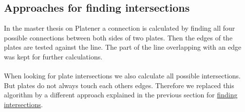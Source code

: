 \documentclass[../ClassicThesis.tex]{subfiles}
\begin{document}
\subsection{Approaches for finding intersections}
In the master thesis on Platener\cite{master-thesis} a connection is calculated by finding all four possible connections between both sides of two plates. Then the edges of the plates are tested against the line. The part of the line overlapping with an edge was kept for further calculations.\\
\*\\
When looking for plate intersections we also calculate all possible intersections. But plates do not always touch each others edges. Therefore we replaced this algorithm by a different approach explained in the previous section for \hyperref[findIntersections]{finding intersections}.
\end{document}
